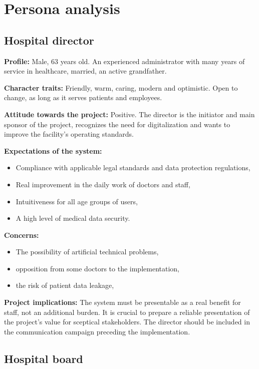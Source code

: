 \section{Persona analysis}

\subsection{Hospital director}

\textbf{Profile:} Male, 63 years old. An experienced administrator with many years of service in healthcare, married, an active grandfather.

\textbf{Character traits:} Friendly, warm, caring, modern and optimistic. Open to change, as long as it serves patients and employees.

\textbf{Attitude towards the project:} Positive. The director is the initiator and main sponsor of the project, recognizes the need for digitalization and wants to improve the facility's operating standards.

\textbf{Expectations of the system:}
\begin{itemize}
    \item Compliance with applicable legal standards and data protection regulations,
    \item Real improvement in the daily work of doctors and staff,
    \item Intuitiveness for all age groups of users,
    \item A high level of medical data security.
\end{itemize}

\textbf{Concerns:}
\begin{itemize}
    \item The possibility of artificial technical problems,
    \item opposition from some doctors to the implementation,
    \item the risk of patient data leakage,
\end{itemize}

\textbf{Project implications:} The system must be presentable as a real benefit for staff, not an additional burden. It is crucial to prepare a reliable presentation of the project's value for sceptical stakeholders. The director should be included in the communication campaign preceding the implementation.

\subsection{Hospital board}

